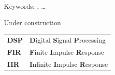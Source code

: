\documentclass[
11pt, %
english, %
singlespacing, %
headsepline, %
]{MastersDoctoralThesis} %
\begin{document}
Keywords: \keywordnames, \ldots %



\begin{acknowledgements} %
\addchaptertocentry{\acknowledgementname} %
Under construction %
\end{acknowledgements}


\tableofcontents %

\listoffigures %

\listoftables %


%
\begin{longtable}{ll}
\textbf{DSP} & \textbf{D}igital \textbf{S}ignal \textbf{P}rocessing\\
\textbf{FIR} & \textbf{F}inite \textbf{I}mpulse \textbf{R}esponse\\
\textbf{IIR} & \textbf{I}nfinite \textbf{I}mpulse \textbf{R}esponse\\
\end{longtable}
\addtocounter{table}{-1} %

\end{document}
